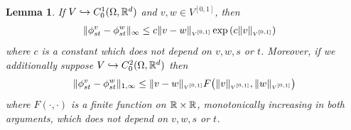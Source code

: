 \documentclass[noinfoline]{imsart}
\newtheorem{lemma}{Lemma}
\begin{document}
\begin{lemma} If $V\hookrightarrow C_0^1(\Omega,\Bbb R^d)$ and $v,w\in V^{[0,1]}$, then
\begin{align}
 \|\phi_{st}^v - \phi_{st}^w    \|_{\infty}& \leq c \| v-w \|_\text{\tiny $V^{[0,1]}$} \exp{\left( c\| v \|_\text{\tiny $V^{[0,1]}$} \right)}
  \label{222}
\end{align}
where $c$ is a constant which does not depend on $v, w, s$ or $t$.
Moreover, if we additionally suppose $V\hookrightarrow C_0^2(\Omega, \Bbb R^d)$ then
\begin{align}
  \label{777}
\| \phi_{st}^v - \phi_{st}^w \|_{1,\infty}\leq \| v-w \|_\text{\tiny $V^{[0,1]}$}  F\bigl( {\|v\|_\text{\tiny $V^{[0,1]}$}},{\|w\|_\text{\tiny $V^{[0,1]}$}}\bigr)
\end{align}
where $F(\cdot,\cdot)$ is  a finite  function on $\Bbb R\times \Bbb R$, monotonically increasing in both arguments, which does not depend on $v, w, s$ or $t$. 
\end{lemma}
\end{document}
